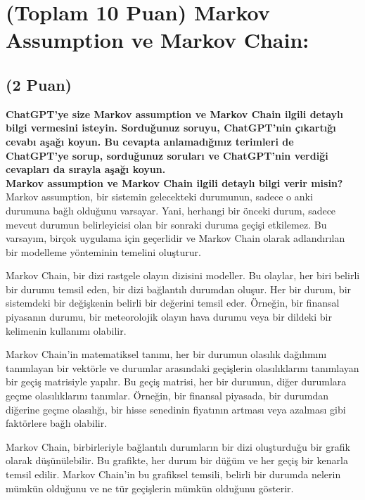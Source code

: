\documentclass[11pt]{article}
\begin{document}
\section{(Toplam 10 Puan) Markov Assumption ve Markov Chain:}

\subsection{(2 Puan)} \textbf{ChatGPT’ye size Markov assumption ve Markov Chain ilgili detaylı bilgi vermesini isteyin. Sorduğunuz soruyu, ChatGPT'nin çıkartığı cevabı aşağı koyun. Bu cevapta anlamadığınız terimleri de ChatGPT’ye sorup, sorduğunuz soruları ve ChatGPT’nin verdiği cevapları da sırayla aşağı koyun.}\\
\textbf{Markov assumption ve Markov Chain ilgili detaylı bilgi verir misin?}\\
Markov assumption, bir sistemin gelecekteki durumunun, sadece o anki durumuna bağlı olduğunu varsayar. Yani, herhangi bir önceki durum, sadece mevcut durumun belirleyicisi olan bir sonraki duruma geçişi etkilemez. Bu varsayım, birçok uygulama için geçerlidir ve Markov Chain olarak adlandırılan bir modelleme yönteminin temelini oluşturur.

Markov Chain, bir dizi rastgele olayın dizisini modeller. Bu olaylar, her biri belirli bir durumu temsil eden, bir dizi bağlantılı durumdan oluşur. Her bir durum, bir sistemdeki bir değişkenin belirli bir değerini temsil eder. Örneğin, bir finansal piyasanın durumu, bir meteorolojik olayın hava durumu veya bir dildeki bir kelimenin kullanımı olabilir.

Markov Chain'in matematiksel tanımı, her bir durumun olasılık dağılımını tanımlayan bir vektörle ve durumlar arasındaki geçişlerin olasılıklarını tanımlayan bir geçiş matrisiyle yapılır. Bu geçiş matrisi, her bir durumun, diğer durumlara geçme olasılıklarını tanımlar. Örneğin, bir finansal piyasada, bir durumdan diğerine geçme olasılığı, bir hisse senedinin fiyatının artması veya azalması gibi faktörlere bağlı olabilir.

Markov Chain, birbirleriyle bağlantılı durumların bir dizi oluşturduğu bir grafik olarak düşünülebilir. Bu grafikte, her durum bir düğüm ve her geçiş bir kenarla temsil edilir. Markov Chain'in bu grafiksel temsili, belirli bir durumda nelerin mümkün olduğunu ve ne tür geçişlerin mümkün olduğunu gösterir.
\end{document}
